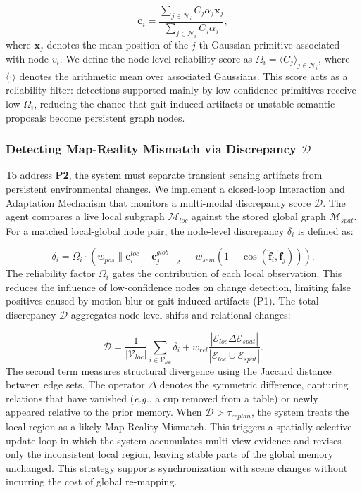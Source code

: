 \documentclass[conference]{IEEEtran}
\begin{document}
\begin{equation}
    \mathbf{c}_i = \frac{\sum_{j \in \mathcal{N}_i} C_j \alpha_j \mathbf{x}_j}{\sum_{j \in \mathcal{N}_i} C_j \alpha_j} \label{eq:grounding} ,
\end{equation}
%
where $\mathbf{x}_j$ denotes the mean position of the $j$-th Gaussian primitive associated with node $v_i$.
%
We define the node-level reliability score as $\Omega_i = \langle C_j \rangle_{j \in \mathcal{N}_i}$, where $\langle \cdot \rangle$ denotes the arithmetic mean over associated Gaussians.
%
This score acts as a reliability filter: detections supported mainly by low-confidence primitives receive low $\Omega_i$, reducing the chance that gait-induced artifacts or unstable semantic proposals become persistent graph nodes.
%


\subsubsection{Detecting Map-Reality Mismatch via Discrepancy $\mathcal{D}$}
%
To address \textbf{P2}, the system must separate transient sensing artifacts from persistent environmental changes.
%
We implement a closed-loop Interaction and Adaptation Mechanism that monitors a multi-modal discrepancy score $\mathcal{D}$.
%
The agent compares a live local subgraph $\mathcal{M}_{loc}$ against the stored global graph $\mathcal{M}_{spat}$.
%
For a matched local-global node pair, the node-level discrepancy $\delta_i$ is defined as:

\begin{equation}
    \delta_i = \Omega_i \cdot \left( w_{pos} \|\mathbf{c}_i^{loc} - \mathbf{c}_j^{glob}\|_2 + w_{sem} (1 - \cos(\hat{\mathbf{f}}_i, \hat{\mathbf{f}}_j)) \right). \label{eq:delta_calc}
\end{equation}
%
The reliability factor $\Omega_i$ gates the contribution of each local observation.
%
This reduces the influence of low-confidence nodes on change detection, limiting false positives caused by motion blur or gait-induced artifacts (P1).
%
The total discrepancy $\mathcal{D}$ aggregates node-level shifts and relational changes:

\begin{equation}
    \mathcal{D} = \frac{1}{|\mathcal{V}_{loc}|} \sum_{i \in \mathcal{V}_{loc}} \delta_i + w_{rel} \frac{|\mathcal{E}_{loc} \Delta \mathcal{E}_{spat}|}{|\mathcal{E}_{loc} \cup \mathcal{E}_{spat}|}. \label{eq:total_discrepancy}
\end{equation}
%
The second term measures structural divergence using the Jaccard distance between edge sets.
%
The operator $\Delta$ denotes the symmetric difference, capturing relations that have vanished (\emph{e.g.}, a cup removed from a table) or newly appeared relative to the prior memory.
%
When $\mathcal{D} > \tau_{replan}$, the system treats the local region as a likely Map-Reality Mismatch.
%
This triggers a spatially selective update loop in which the system accumulates multi-view evidence and revises only the inconsistent local region, leaving stable parts of the global memory unchanged.
%
This strategy supports synchronization with scene changes without incurring the cost of global re-mapping.
\end{document}
